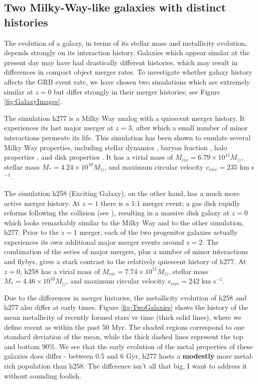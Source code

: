 \documentclass[nofootinbib,twocolumn,prd]{emulateapj}
\newcommand\editremark[1]{{\color{red}#1}}
\newcommand\msun{M_\odot}
\begin{document}
\subsection{Two Milky-Way-like galaxies with distinct histories }

The evolution
of a galaxy, in terms of its stellar mass and metallicity evolution,
depends strongly on its interaction history.  Galaxies which appear
similar at the present day may have had drastically different
histories, which may result in differences in compact object merger
rates.  To investigate whether galaxy history affects the GRB event
rate, we have chosen two simulations which are extremely similar at $z
= 0$ but differ strongly in their merger histories; see Figure \ref{fig:GalaxyImages}.

The simulation h277  is a Milky Way analog with a
quiescent merger history.  It experiences its last major merger at $z
= 3$, after which a small number of minor interactions permeate its
life.  This simulation has been shown to emulate several Milky Way
properties, including stellar dynamics
\citep{Loebman12,Loebman14,Kassin14}, baryon fraction
\citep{Munshi13}, halo properties \citep{Zolotov09,Zolotov10}, and
disk properties \citep{Brooks11}.  It has a virial mass of $M_{vir} =
6.79 \times 10^{11} \msun$, stellar mass $M_* = 4.24 \times 10^{10}
\msun$, and maximum circular velocity $v_{circ} = 235$ km s$^{-1}$.

  The simulation h258 (Exciting Galaxy), on the other hand, has a much
  more active merger history.  At $z = 1$ there is a 1:1 merger event;
  a gas disk rapidly reforms following the collision (see
  \citet{Governato09}), resulting in a massive disk galaxy at $z = 0$
  which looks remarkably similar to the Milky Way and to the other
  simulation, h277.  Prior to the $z = 1$ merger, each of the two
  progenitor galaxies actually experiences its own additional major
  merger events around $z = 2$.  The combination of
  the series of major mergers, plus a number of minor interactions and
  flybys, gives a stark contrast to the relatively quiescent history
  of h277.  At $z = 0$, h258 has a virial mass of $M_{vir} = 7.74
  \times 10^{11} \msun$, stellar mass $M_* = 4.46 \times 10^{10}
  \msun$, and maximum circular velocity $v_{circ} = 242$ km s$^{-1}$.  %


  Due to the differences in merger histories, the metallicity
  evolution of h258 and h277 also differ at early times.  Figure
  \ref{fig:TwoGalaxies} shows the history of the mean metallicity of
  recently formed stars vs time (thick solid lines), where we define
  recent as within the past 50 Myr.  The shaded regions correspond to
  one standard deviation of the mean, while the thick dashed lines
  represent the top and bottom 90\%.  We see that the early evolution
  of the metal properties of these galaxies does differ - between 0.5
  and 6 Gyr, h277 hosts a {\bf modestly} more metal-rich population than
  h258. \editremark{The difference isn't all that big, I want to address it without sounding foolish.}
\end{document}
